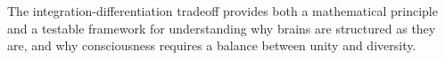 \noindent The integration-differentiation tradeoff provides both a mathematical principle and a testable framework for understanding why brains are structured as they are, and why consciousness requires a balance between unity and diversity.


